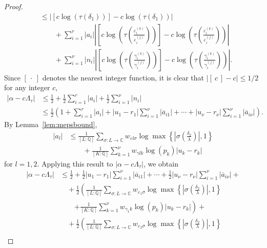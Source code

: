\begin{proof}
\begin{align*}
	& \leq \left| [c\log(\tau(\delta_1))] - c\log\left(\tau\left(\delta_1\right)\right)\right| \\
	& \quad \quad  + \sum_{i = 1}^r |a_i|\left| \left[c\log\left(\tau\left(\frac{\varepsilon_i^{(k)}}{\varepsilon_i^{(j)}}\right)\right)\right] - c\log\left(\tau\left( \frac{\varepsilon_i^{(k)}}{\varepsilon_i^{(j)}}\right) \right)\right|\\
	& \quad \quad +  \sum_{i = 1}^{\nu} |n_i|\left| \left[c\log\left(\tau\left(\frac{\gamma_i^{(k)}}{\gamma_i^{(j)}}\right)\right)\right] - c\log \left(\tau\left( \frac{\gamma_i^{(k)}}{\gamma_i^{(j)}}\right)\right)\right|.
\end{align*}
Since $[ \ \cdot \ ]$ denotes the nearest integer function, it is clear that $|[ \ c \ ] - c| \leq 1/2$ for any integer $c$, 
\begin{align*}
|\alpha-c\Lambda_\tau|
	& \leq \frac{1}{2} + \frac{1}{2}\sum_{i = 1}^r |a_i| + \frac{1}{2}\sum_{i = 1}^{\nu} |n_i|\\
	& \leq \frac{1}{2}\left(1 + \sum_{i = 1}^r |a_i| + |u_1-r_1|\sum_{i=1}^{\nu}|\overline{a}_{i1}| + \cdots + |u_{\nu} - r_{\nu}| \sum_{i=1}^{\nu}|\overline{a}_{i\nu}|\right).
\end{align*}
By Lemma~\ref{lem:mepsbound}, 
\begin{align*}
|a_l| &\leq \frac{1}{[L:\mathbb{Q}]}\sum_{\sigma :L \to \mathbb{C}} w_{\varepsilon l \sigma}\log \max \left\{ \left|\sigma\left(\frac{\delta_2}{\lambda}\right)\right|, 1\right\} \\
	& \quad \quad+ \frac{1}{[K:\mathbb{Q}]}\sum_{k = 1}^{\nu} w_{\gamma l k}\log(p_k)|u_k - r_k|
\end{align*}
for $l = 1,2$. Applying this result to $|\alpha-c\Lambda_\tau|$, we obtain
\begin{align*}
|\alpha-c\Lambda_\tau| 
	& \leq \frac{1}{2} + \frac{1}{2}|u_1-r_1|\sum_{i=1}^{\nu}|\overline{a}_{i1}| + \cdots + \frac{1}{2}|u_{\nu} - r_{\nu}| \sum_{i=1}^{\nu}|\overline{a}_{i\nu}| + \\
	& \quad + \frac{1}{2}\left(\frac{1}{[L:\mathbb{Q}]}\sum_{\sigma :L \to \mathbb{C}} w_{\varepsilon_1 \sigma}\log \max \left\{ \left|\sigma\left(\frac{\delta_2}{\lambda}\right)\right|, 1\right\} \right.\\
	&\quad\quad \left.+ \frac{1}{[K:\mathbb{Q}]}\sum_{k = 1}^{\nu} w_{\gamma_1 k}\log(p_k)|u_k - r_k| \right) + \\
	&\quad + \frac{1}{2}\left(\frac{1}{[L:\mathbb{Q}]}\sum_{\sigma :L \to \mathbb{C}} w_{\varepsilon_2 \sigma}\log \max \left\{ \left|\sigma\left(\frac{\delta_2}{\lambda}\right)\right|, 1\right\} \right.\\

\end{align*}
\end{proof}
